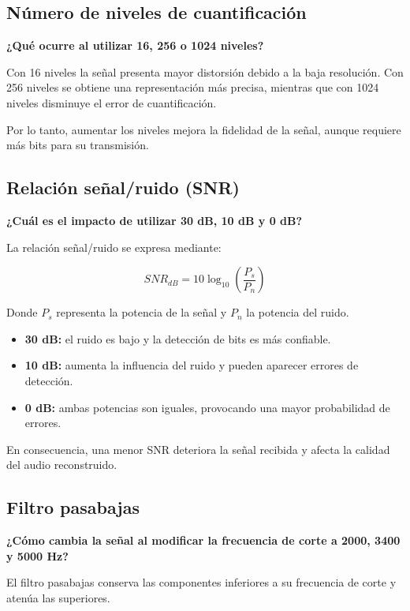 \documentclass[12pt,a4paper]{article}
\begin{document}
\subsection{Número de niveles de cuantificación}

\textbf{¿Qué ocurre al utilizar 16, 256 o 1024 niveles?}

Con 16 niveles la señal presenta mayor distorsión debido
a la baja resolución. Con 256 niveles se obtiene una
representación más precisa, mientras que con 1024 niveles
disminuye el error de cuantificación.

Por lo tanto, aumentar los niveles mejora la fidelidad
de la señal, aunque requiere más bits para su transmisión.

\subsection{Relación señal/ruido (SNR)}

\textbf{¿Cuál es el impacto de utilizar 30 dB, 10 dB y 0 dB?}

La relación señal/ruido se expresa mediante:

\[
SNR_{dB}=10\log_{10}\left(\frac{P_s}{P_n}\right)
\]

Donde $P_s$ representa la potencia de la señal y $P_n$
la potencia del ruido.

\begin{itemize}
    \item \textbf{30 dB:} el ruido es bajo y la detección
    de bits es más confiable.
    \item \textbf{10 dB:} aumenta la influencia del ruido
    y pueden aparecer errores de detección.
    \item \textbf{0 dB:} ambas potencias son iguales,
    provocando una mayor probabilidad de errores.
\end{itemize}

En consecuencia, una menor SNR deteriora la señal recibida
y afecta la calidad del audio reconstruido.

\subsection{Filtro pasabajas}

\textbf{¿Cómo cambia la señal al modificar la frecuencia
de corte a 2000, 3400 y 5000 Hz?}

El filtro pasabajas conserva las componentes inferiores
a su frecuencia de corte y atenúa las superiores.
\end{document}
